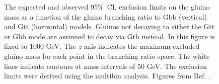 \begin{figure}[htbp]
  \centering 
  \caption{The expected  and observed  95\%~CL exclusion limits on the gluino mass as a function of the gluino branching ratio to Gbb (vertical) and Gtt (horizontal) models. Gluinos not decaying to either the Gtt or Gbb mode are assumed to decay via Gtb instead. In this figure \mchi is fixed to 1000 GeV. The $z$-axis indicates the maximum excluded gluino mass for each point in the branching ratio space. The white lines indicate contours at mass intervals of 50 GeV. The exclusion limits were derived using the multibin analysis.
  Figures from Ref. \cite{ATLAS-CONF-2018-041}.}
  \label{fig:limits_triangle_1000}
\end{figure}


